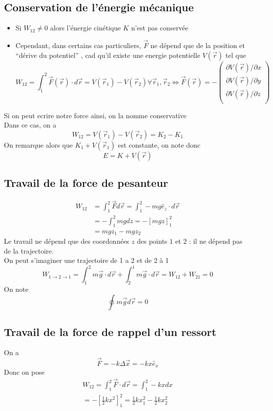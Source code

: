 \documentclass[../main.tex]{subfiles}
\begin{document}
\subsection{Conservation de l'énergie mécanique}
\begin{itemize}
\item Si $W_{12} \neq 0$ alors l'énergie cinétique $K$ n'est pas conservée
\item Cependant, dans certains cas particuliers, $\vec{F}$ ne dépend que de la position et ``dérive du potentiel'' , cad qu'il existe une energie potentielle $V( \vec{r}) $ tel que
	\[ 
		W_{12} = \int_{ 1 }^{ 2 } \vec{F}( \vec{r}) \cdot d \vec{r} = V( \vec{r}_1)  - V( \vec{r}_2) \forall \vec{r}_1, \vec{r}_2 \iff \vec{F}( \vec{r}) = - 
			\begin{pmatrix}
			\partial V( \vec{r}) / \partial x\\		
			\partial V( \vec{r}) / \partial y\\		
			\partial V( \vec{r}) / \partial z\\		
			\end{pmatrix}
	\]
	
\end{itemize}
Si on peut ecrire notre force ainsi, on la nomme conservative\\
Dans ce cas, on a 
\[ 
	W_{12} = V( \vec{r}_1) - V( \vec{r}_2) = K_2-K_1
\]
On remarque alors que $ K_1 + V( \vec{r}_1) $ est constante, on note donc
\[ 
	E = K + V( \vec{r}) 
\]



\subsection{Travail de la force de pesanteur}
\begin{align*}
	W_{12} &= \int_{ 1 }^{ 2 }\vec{F} d \vec{r} = \int_{ 1 }^{ 2 } -mg \hat{e}_z \cdot d \vec{r}\\
	       &= - \int_{ 1 }^{ 2 } mg dz = - [ mgz] _{1} ^{2}\\
	       &=mgz_1- mgz_2
\end{align*}
Le travail ne dépend que des coordonnées $z$ des points $1$ et $2$ : il ne dépend pas de la trajectoire.\\
On peut s'imaginer une trajectoire de 1 a 2 et de 2 à 1
\[ 
W_{1\to 2 \to 1} = \int_{ 1 }^{ 2 } m \vec{g} \cdot d \vec{r} + \int_{ 2 }^{ 1 } m \vec{g} \cdot d \vec{r} = W_{12} + W_{21} = 0
\]
On note
\[ 
\oint m \vec{g} d \vec{r} = 0
\]
\subsection{Travail de la force de rappel d'un ressort}
On a 
\[ 
\vec{F} = - k \Delta \vec{x} = - k x \hat{e}_x
\]
Donc on pose
\begin{align*}
W_{12} = \int_{ 1 }^{ 2 } \vec{F} \cdot d \vec{r} = \int_{ 1 }^{ 2 }-k x dx\\
= - [ \frac{1}{2}k x^{2}] _{1} ^{2} = \frac{1}{2}k x_1^{2} - \frac{1}{2}k x_2^{2}
\end{align*}
\end{document}
